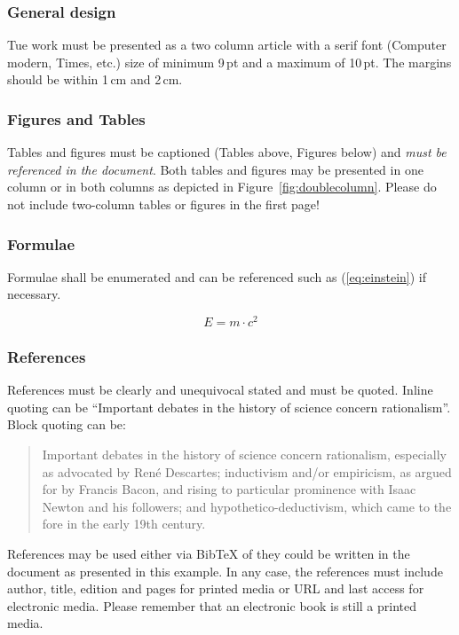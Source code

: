\documentclass[a4paper, 10pt]{IEEEtran}
\begin{document}
	\subsubsection{General design}
	
	Tue work must be presented as a two column article with a serif font (Computer modern, Times, etc.)  size of minimum 9\,pt and a maximum of 10\,pt. The margins should be within 1\,cm and 2\,cm.
	
	\subsubsection{Figures and Tables}
	Tables and figures must be captioned (Tables above, Figures below) and \emph{must be referenced in the document}. Both tables and figures may be presented in one column or in both columns as depicted in Figure~\ref{fig:doublecolumn}. Please do not include two-column tables or figures in the first page!
	

	
	\subsubsection{Formulae}
	Formulae shall be enumerated and can be referenced such as (\ref{eq:einstein}) if necessary.
	
	\begin{equation}
		E=m\cdot c^2 \label{eq:einstein}
	\end{equation}
	
	\subsubsection{References}
	References must be clearly and unequivocal stated and must be quoted. Inline quoting can be ``Important debates in the history of science concern rationalism''\cite{scientificMethod}. Block quoting can be:
	\begin{quotation}
		Important debates in the history of science concern rationalism, especially as advocated by René Descartes; inductivism and/or empiricism, as argued for by Francis Bacon, and rising to particular prominence with Isaac Newton and his followers; and hypothetico-deductivism, which came to the fore in the early 19th century.\cite{scientificMethod}
	\end{quotation}
	
	References may be used either via BibTeX of they could be written in the document as presented in this example. In any case, the references must include author, title, edition and pages for printed media or URL and last access for electronic media. Please remember that an electronic book is still a printed media.
	
\end{document}
